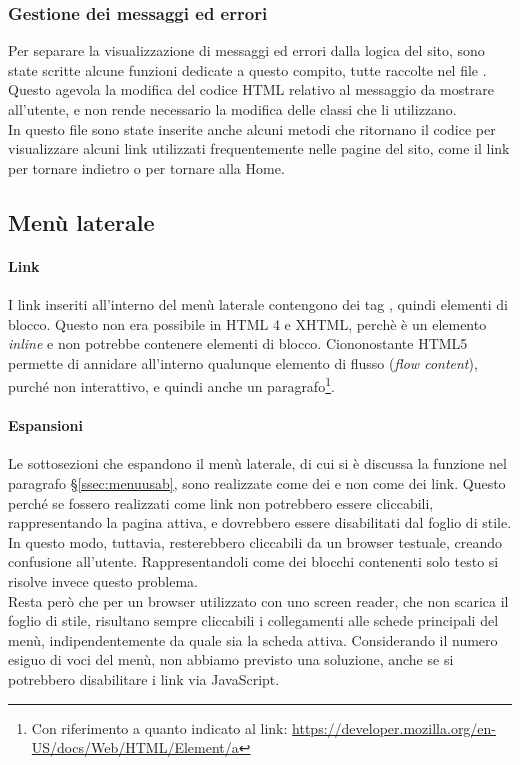 \documentclass[12pt]{article}
\begin{document}
	 \subsubsection{Gestione dei messaggi ed errori}
	 Per separare la visualizzazione di messaggi ed errori dalla logica del sito, sono state scritte alcune funzioni dedicate a questo compito, tutte raccolte nel file . Questo agevola la modifica del codice HTML relativo al messaggio da mostrare all'utente, e non rende necessario la modifica delle classi che li utilizzano.\\In questo file sono state inserite anche alcuni metodi che ritornano il codice per visualizzare alcuni link utilizzati frequentemente nelle pagine del sito, come il link per tornare indietro o per tornare alla Home.


	\subsection{Menù laterale}
	\paragraph{Link}
	I link inseriti all'interno del menù laterale contengono dei tag , quindi elementi di blocco. Questo non era possibile in HTML 4 e XHTML, perchè  è un elemento \textit{inline} e non potrebbe contenere elementi di blocco. Ciononostante HTML5 permette di annidare all'interno qualunque elemento di flusso (\textit{flow content}), purché non interattivo, e quindi anche un paragrafo\footnote{Con riferimento a quanto indicato al link: \url{https://developer.mozilla.org/en-US/docs/Web/HTML/Element/a}}.
	\paragraph{Espansioni}
	Le sottosezioni che espandono il menù laterale, di cui si è discussa la funzione nel paragrafo §\ref{ssec:menuusab}, sono realizzate come dei  e non come dei link. Questo perché se fossero realizzati come link non potrebbero essere cliccabili, rappresentando la pagina attiva, e dovrebbero essere disabilitati dal foglio di stile. In questo modo, tuttavia, resterebbero cliccabili da un browser testuale, creando confusione all'utente. Rappresentandoli come dei blocchi contenenti solo testo si risolve invece questo problema.\\
	Resta però che per un browser utilizzato con uno screen reader, che non scarica il foglio di stile, risultano sempre cliccabili i collegamenti alle schede principali del menù, indipendentemente da quale sia la scheda attiva. Considerando il numero esiguo di voci del menù, non abbiamo previsto una soluzione, anche se si potrebbero disabilitare i link via JavaScript.
	
\end{document}
